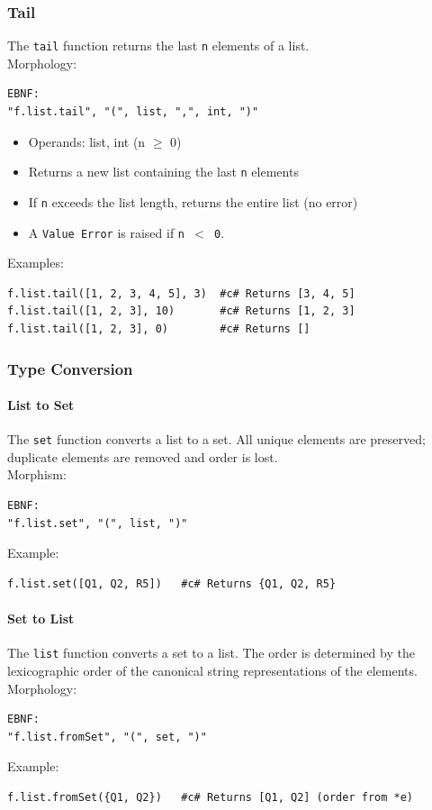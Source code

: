 \subsubsection{Tail}
The \texttt{tail} function returns the last \texttt{n} elements of a list.\\
Morphology:
\begin{verbatim}
EBNF:
"f.list.tail", "(", list, ",", int, ")"
\end{verbatim}
\begin{itemize}
\item Operands: list, int (n $\geq$ 0)
\item Returns a new list containing the last \texttt{n} elements
\item If \texttt{n} exceeds the list length, returns the entire list (no error)
\item A \texttt{Value Error} is raised if \texttt{n $<$ 0}.
\end{itemize}
Examples:
\begin{verbatim}
f.list.tail([1, 2, 3, 4, 5], 3)  #c# Returns [3, 4, 5]
f.list.tail([1, 2, 3], 10)       #c# Returns [1, 2, 3]
f.list.tail([1, 2, 3], 0)        #c# Returns []
\end{verbatim}

\subsubsection{Type Conversion}
\paragraph{List to Set}
The \texttt{set} function converts a list to a set. All unique elements are preserved; duplicate elements are removed and order is lost. \\
Morphism:
\begin{verbatim}
EBNF:
"f.list.set", "(", list, ")"
\end{verbatim}
Example:
\begin{verbatim}
f.list.set([Q1, Q2, R5])   #c# Returns {Q1, Q2, R5}
\end{verbatim}

\paragraph{Set to List}
The \texttt{list} function converts a set to a list. The order is determined by the lexicographic order of the canonical string representations of the elements. \\
Morphology:
\begin{verbatim}
EBNF:
"f.list.fromSet", "(", set, ")"
\end{verbatim}
Example:
\begin{verbatim}
f.list.fromSet({Q1, Q2})   #c# Returns [Q1, Q2] (order from *e)
\end{verbatim}

